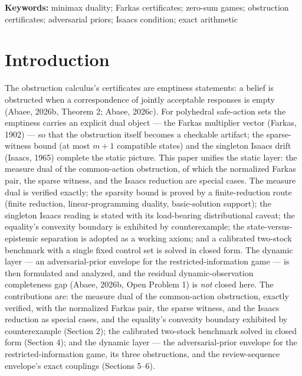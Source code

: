 \documentclass[10pt,twocolumn]{article}
\theoremstyle{definition}
\begin{document}
\vspace{0.4em}
\noindent\textbf{Keywords:} minimax duality; Farkas certificates; zero-sum
games; obstruction certificates; adversarial priors; Isaacs condition;
exact arithmetic

\section{Introduction}

The obstruction calculus's certificates are emptiness statements: a belief is
obstructed when a correspondence of jointly acceptable responses is empty
(Abaee, 2026b, Theorem 2; Abaee, 2026c). For polyhedral safe-action sets the
emptiness carries an explicit dual object --- the Farkas multiplier vector (Farkas, 1902)
--- so that the obstruction itself becomes a checkable artifact; the
sparse-witness bound (at most $m+1$ compatible states) and the singleton
Isaacs drift (Isaacs, 1965) complete the static picture. This paper unifies the static layer: the measure dual of the common-action obstruction, of which the normalized Farkas pair, the sparse witness, and the Isaacs reduction are special cases. The measure dual is verified exactly; the sparsity bound is proved by a finite-reduction route (finite reduction, linear-programming duality, basic-solution support); the singleton Isaacs reading is stated with its load-bearing distributional caveat; the equality's convexity boundary is exhibited by counterexample; the state-versus-epistemic separation is adopted as a working axiom; and a calibrated two-stock benchmark with a single fixed control set is solved in closed form. The dynamic layer --- an adversarial-prior envelope for the restricted-information game --- is then formulated and analyzed, and the residual dynamic-observation completeness gap (Abaee, 2026b, Open Problem 1) is \emph{not} closed here. The contributions are: the measure dual of the common-action obstruction, exactly verified, with the normalized Farkas pair, the sparse witness, and the Isaacs reduction as special cases, and the equality's convexity boundary exhibited by counterexample (Section 2); the calibrated two-stock benchmark solved in closed form (Section 4); and the dynamic layer --- the adversarial-prior envelope for the restricted-information game, its three obstructions, and the review-sequence envelope's exact couplings (Sections 5--6).
\end{document}
